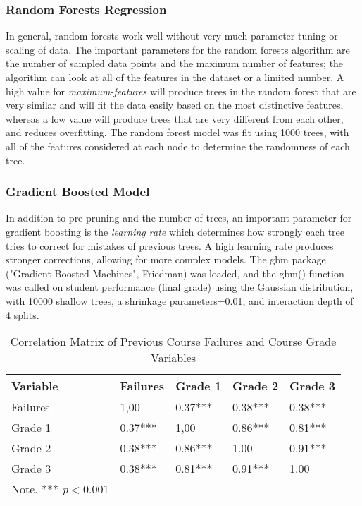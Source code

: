 \documentclass[sigconf]{acmart}
\begin{document}
\subsubsection{Random Forests Regression} 

In general, random forests work well without very much parameter tuning or 
scaling of data. The important parameters for the random forests algorithm are 
the number of sampled data points and the maximum number of features; the 
algorithm can look at all of the features in the dataset or a limited number. 
A high value for \emph{maximum-features} will produce trees in the random 
forest that are very similar and will fit the data easily based on the most 
distinctive features, whereas a low value will produce trees that are very 
different from each other, and reduces overfitting. The random forest model 
was fit using 1000 trees, with all of the features considered at each node 
to determine the randomness of each tree. 


\subsubsection{Gradient Boosted Model} 

In addition to pre-pruning and the number of trees, an important parameter 
for gradient boosting is the \emph{learning rate} which determines how 
strongly each tree tries to correct for mistakes of previous trees. A high 
learning rate produces stronger corrections, allowing for more complex models. 
The gbm package ("Gradient Boosted Machines", Friedman) was loaded, and the 
gbm() function was called on student performance (final grade) using the 
Gaussian distribution, with 10000 shallow trees, a shrinkage parameters=0.01, 
and interaction depth of 4 splits. 


\begin{table}
  \caption{Correlation Matrix of Previous Course Failures and Course Grade 
  Variables}
  \label{tab:freq}
  \begin{tabular}{lllll}
    \toprule
    Variable    & Failures  & Grade 1 & Grade 2 & Grade 3  \\
    \midrule
    Failures    &  1,00     &  0.37***  & 0.38***   &  0.38***  \\
    Grade 1     &  0.37***  &  1,00     & 0.86***   &  0.81***  \\
    Grade 2     &  0.38***  &  0.86***  & 1.00      &  0.91***  \\  
    Grade 3     &  0.38***  &  0.81***  & 0.91***   &  1.00     \\    
    \bottomrule
    Note. *** \textit{p}$<$0.001 & & &
  \end{tabular}
\end{table}
\end{document}
